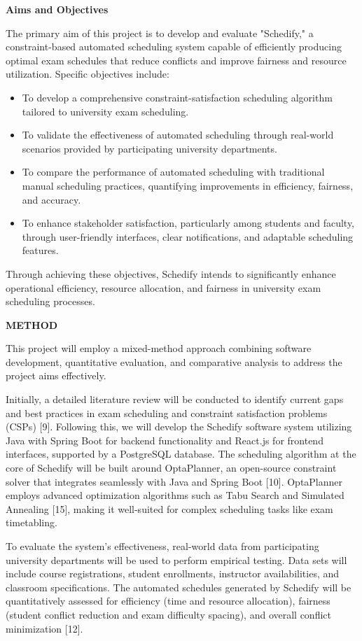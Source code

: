 \documentclass[10pt,a4paper]{article}
\newcommand{\subhead}[1]{\vspace{0.8em}\noindent\textbf{\fontsize{10}{11}\selectfont #1}\par\vspace{0.3em}}
\begin{document}
\subhead{Aims and Objectives}
The primary aim of this project is to develop and evaluate "Schedify," a constraint-based automated scheduling system capable of efficiently producing optimal exam schedules that reduce conflicts and improve fairness and resource utilization. Specific objectives include:
\begin{itemize}
    \item To develop a comprehensive constraint-satisfaction scheduling algorithm tailored to university exam scheduling.
    \item To validate the effectiveness of automated scheduling through real-world scenarios provided by participating university departments.
    \item To compare the performance of automated scheduling with traditional manual scheduling practices, quantifying improvements in efficiency, fairness, and accuracy.
    \item To enhance stakeholder satisfaction, particularly among students and faculty, through user-friendly interfaces, clear notifications, and adaptable scheduling features.
\end{itemize}
Through achieving these objectives, Schedify intends to significantly enhance operational efficiency, resource allocation, and fairness in university exam scheduling processes.

\subhead{METHOD}
This project will employ a mixed-method approach combining software development, quantitative evaluation, and comparative analysis to address the project aims effectively.

Initially, a detailed literature review will be conducted to identify current gaps and best practices in exam scheduling and constraint satisfaction problems (CSPs) [9]. Following this, we will develop the Schedify software system utilizing Java with Spring Boot for backend functionality and React.js for frontend interfaces, supported by a PostgreSQL database. The scheduling algorithm at the core of Schedify will be built around OptaPlanner, an open-source constraint solver that integrates seamlessly with Java and Spring Boot [10]. OptaPlanner employs advanced optimization algorithms such as Tabu Search and Simulated Annealing [15], making it well-suited for complex scheduling tasks like exam timetabling.

To evaluate the system's effectiveness, real-world data from participating university departments will be used to perform empirical testing. Data sets will include course registrations, student enrollments, instructor availabilities, and classroom specifications. The automated schedules generated by Schedify will be quantitatively assessed for efficiency (time and resource allocation), fairness (student conflict reduction and exam difficulty spacing), and overall conflict minimization [12].
\end{document}
